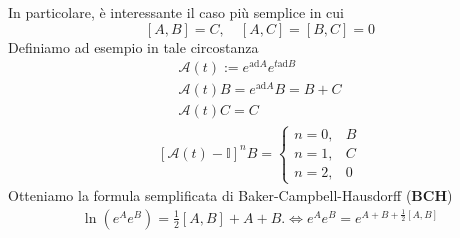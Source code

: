 In particolare, è interessante il caso più semplice in cui $$\left[A,B\right]=C, \quad \left[A,C\right]=\left[B,C\right]=0$$
Definiamo ad esempio in tale circostanza
\begin{equation*}\begin{split}
\mathcal{A}\left(t\right):=e^{\textrm{ad}A}e^{t\textrm{ad}B} \\
\mathcal{A}\left(t\right)B=e^{\textrm{ad}A}B=B+C \\
\mathcal{A}\left(t\right)C=C
\end{split}\end{equation*}
\begin{equation*}\begin{split}
\left[\mathcal{A}\left(t\right)-\mathbb{I}\right]^nB=\begin{cases}
n=0, & B \\
n=1, & C \\
n=2, & 0
\end{cases}
\end{split}\end{equation*}
Otteniamo la formula semplificata di Baker-Campbell-Hausdorff (\textbf{BCH})
\begin{equation*}\begin{split}
\ln{\left(e^Ae^B\right)}=\frac{1}{2}\left[A,B\right]+A+B. \Longleftrightarrow e^{A}e^{B}=e^{A+B+\frac{1}{2}\left[A,B\right]}
\end{split}\end{equation*}

